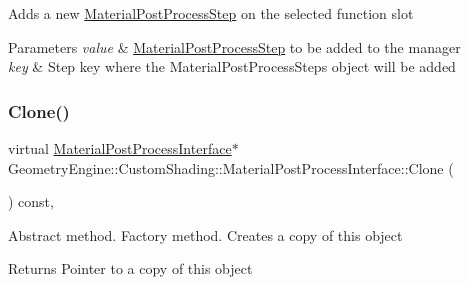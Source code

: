 Adds a new \mbox{\hyperlink{class_geometry_engine_1_1_custom_shading_1_1_material_post_process_step}{Material\+Post\+Process\+Step}} on the selected function slot 
\begin{DoxyParams}{Parameters}
{\em value} & \mbox{\hyperlink{class_geometry_engine_1_1_custom_shading_1_1_material_post_process_step}{Material\+Post\+Process\+Step}} to be added to the manager \\
\hline
{\em key} & Step key where the Material\+Post\+Process\+Steps object will be added \\
\hline
\end{DoxyParams}
\mbox{\label{class_geometry_engine_1_1_custom_shading_1_1_material_post_process_interface_ad153baf46cac36c9af3c265c7348fd94}} 
\subsubsection{\texorpdfstring{Clone()}{Clone()}}
{\footnotesize\ttfamily virtual \mbox{\hyperlink{class_geometry_engine_1_1_custom_shading_1_1_material_post_process_interface}{Material\+Post\+Process\+Interface}}$\ast$ Geometry\+Engine\+::\+Custom\+Shading\+::\+Material\+Post\+Process\+Interface\+::\+Clone (\begin{DoxyParamCaption}{ }\end{DoxyParamCaption}) const\hspace{0.3cm}{\ttfamily [inline]}, {\ttfamily [virtual]}}

Abstract method. Factory method. Creates a copy of this object \begin{DoxyReturn}{Returns}
Pointer to a copy of this object 
\end{DoxyReturn}
\mbox{\label{class_geometry_engine_1_1_custom_shading_1_1_material_post_process_interface_a5c57e0728a681c3007fdc2b0359aca70}} 
